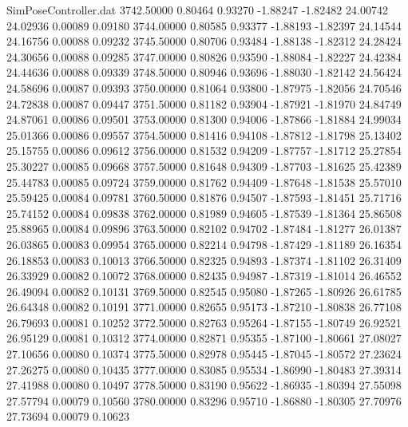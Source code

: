 \begin{filecontents}{SimPoseController.dat}
3742.50000    0.80464    0.93270    -1.88247   -1.82482   24.00742   24.02936    0.00089    0.09180
3744.00000    0.80585    0.93377    -1.88193   -1.82397   24.14544   24.16756    0.00088    0.09232
3745.50000    0.80706    0.93484    -1.88138   -1.82312   24.28424   24.30656    0.00088    0.09285
3747.00000    0.80826    0.93590    -1.88084   -1.82227   24.42384   24.44636    0.00088    0.09339
3748.50000    0.80946    0.93696    -1.88030   -1.82142   24.56424   24.58696    0.00087    0.09393
3750.00000    0.81064    0.93800    -1.87975   -1.82056   24.70546   24.72838    0.00087    0.09447
3751.50000    0.81182    0.93904    -1.87921   -1.81970   24.84749   24.87061    0.00086    0.09501
3753.00000    0.81300    0.94006    -1.87866   -1.81884   24.99034   25.01366    0.00086    0.09557
3754.50000    0.81416    0.94108    -1.87812   -1.81798   25.13402   25.15755    0.00086    0.09612
3756.00000    0.81532    0.94209    -1.87757   -1.81712   25.27854   25.30227    0.00085    0.09668
3757.50000    0.81648    0.94309    -1.87703   -1.81625   25.42389   25.44783    0.00085    0.09724
3759.00000    0.81762    0.94409    -1.87648   -1.81538   25.57010   25.59425    0.00084    0.09781
3760.50000    0.81876    0.94507    -1.87593   -1.81451   25.71716   25.74152    0.00084    0.09838
3762.00000    0.81989    0.94605    -1.87539   -1.81364   25.86508   25.88965    0.00084    0.09896
3763.50000    0.82102    0.94702    -1.87484   -1.81277   26.01387   26.03865    0.00083    0.09954
3765.00000    0.82214    0.94798    -1.87429   -1.81189   26.16354   26.18853    0.00083    0.10013
3766.50000    0.82325    0.94893    -1.87374   -1.81102   26.31409   26.33929    0.00082    0.10072
3768.00000    0.82435    0.94987    -1.87319   -1.81014   26.46552   26.49094    0.00082    0.10131
3769.50000    0.82545    0.95080    -1.87265   -1.80926   26.61785   26.64348    0.00082    0.10191
3771.00000    0.82655    0.95173    -1.87210   -1.80838   26.77108   26.79693    0.00081    0.10252
3772.50000    0.82763    0.95264    -1.87155   -1.80749   26.92521   26.95129    0.00081    0.10312
3774.00000    0.82871    0.95355    -1.87100   -1.80661   27.08027   27.10656    0.00080    0.10374
3775.50000    0.82978    0.95445    -1.87045   -1.80572   27.23624   27.26275    0.00080    0.10435
3777.00000    0.83085    0.95534    -1.86990   -1.80483   27.39314   27.41988    0.00080    0.10497
3778.50000    0.83190    0.95622    -1.86935   -1.80394   27.55098   27.57794    0.00079    0.10560
3780.00000    0.83296    0.95710    -1.86880   -1.80305   27.70976   27.73694    0.00079    0.10623

\end{filecontents}
